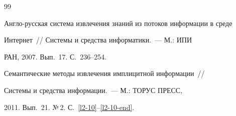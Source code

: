 {{\begin{thebibliography}{99}




Англо-русская система извлечения знаний из потоков информации в среде 


Интернет~/\!\!/ Системы и средства информатики.~--- М.: ИПИ 


РАН, 2007.  Вып.~17. С.~236--254.








 \label{end\stat}









Семантические методы извлечения имплицитной информации~/\!\!/ 


Системы и средства информации.~--- М.: ТОРУС ПРЕСС, 


2011.  Вып.~21. №\,2. С.~\ref{l2-10}--\ref{l2-10-end}.  


\end{thebibliography}


}


}    


